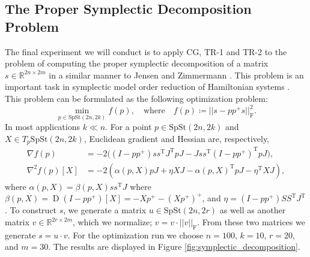 \subsection{The Proper Symplectic Decomposition Problem}
The final experiment we will conduct is to apply CG, TR-1 and TR-2 to the problem of computing the proper symplectic decomposition of a matrix $s\in \mathbb{R}^{2n\times 2m}$ in a similar manner to Jensen and Zimmermann \cite[p.~18]{JensenZimmermann2024}. This problem is an important task in symplectic model order reduction of Hamiltonian systems \cite{same as JZ}. This problem can be formulated as the following optimization problem:
%
\begin{equation}
\min_{p \in \mathrm{SpSt}(2n, 2k)}f(p),\quad\text{where}\quad f(p)\coloneqq\lvert \lvert s-pp^{+}s \rvert  \rvert _{\mathrm{F}}^{2}.
\end{equation}
%
In most applications $k\ll n$. For a point $p\in \mathrm{SpSt}(2n, 2k)$ and $X\in T_{p}\mathrm{SpSt}(2n, 2k)$, Euclidean gradient and Hessian are, respectively,
%
\begin{align*}
\nabla f(p)&=-2\big((I-pp^{+})ss^{\mathrm{T}}J^{\mathrm{T}}pJ-Jss^{\mathrm{T}}(I-pp^{+})^{\mathrm{T}}pJ\big), \\
\nabla^{2}f(p)[X]&=-2(\alpha(p,X)pJ+\eta XJ-\alpha(p,X)^{\mathrm{T}}pJ-\eta ^{\mathrm{T}}XJ),
\end{align*}
%
where $\alpha(p,X)=\beta(p,X)ss^{\mathrm{T}}J$ where $\beta(p,X)=\operatorname{D}(I-pp^{+})[X]=-Xp^{+}-(Xp^{+})^{+}$, and $\eta=(I-pp^{+})SS^{\mathrm{T}}J^{\mathrm{T}}$. To construct $s$, we generate a matrix $u\in \mathrm{SpSt}(2n, 2r)$ as well as another matrix $v\in \mathbb{R}^{2r\times 2m}$, which we normalize; $v=v\cdot \lvert \lvert v \rvert \rvert_{\mathrm{F}}$. From these two matrices we generate $s=u\cdot v$. For the optimization run we choose $n=100$, $k=10$, $r=20$, and $m=30$. The results are displayed in Figure \ref{fig:symplectic_decomposition}.

